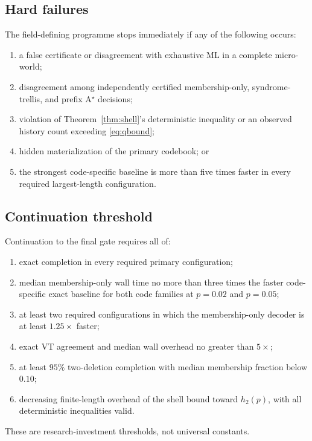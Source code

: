 \documentclass[11pt]{article}
\theoremstyle{definition}
\theoremstyle{remark}
\begin{document}
\subsection{Hard failures}
The field-defining programme stops immediately if any of the following occurs:
\begin{enumerate}[leftmargin=2em]
\item a false certificate or disagreement with exhaustive ML in a complete micro-world;
\item disagreement among independently certified membership-only, syndrome-trellis, and prefix A$^\star$ decisions;
\item violation of Theorem~\ref{thm:shell}'s deterministic inequality or an observed history count exceeding \eqref{eq:qbound};
\item hidden materialization of the primary codebook; or
\item the strongest code-specific baseline is more than five times faster in every required largest-length configuration.
\end{enumerate}

\subsection{Continuation threshold}
Continuation to the final gate requires all of:
\begin{enumerate}[leftmargin=2em]
\item exact completion in every required primary configuration;
\item median membership-only wall time no more than three times the faster code-specific exact baseline for both code families at $p=0.02$ and $p=0.05$;
\item at least two required configurations in which the membership-only decoder is at least $1.25\times$ faster;
\item exact VT agreement and median wall overhead no greater than $5\times$;
\item at least $95\%$ two-deletion completion with median membership fraction below $0.10$;
\item decreasing finite-length overhead of the shell bound toward $h_2(p)$, with all deterministic inequalities valid.
\end{enumerate}

These are research-investment thresholds, not universal constants.
\end{document}
